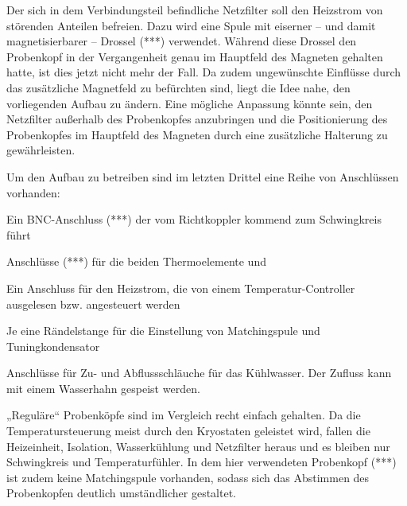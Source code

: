 
Der sich in dem Verbindungsteil befindliche Netzfilter soll den Heizstrom von störenden Anteilen befreien. Dazu wird eine Spule mit eiserner -- und damit magnetisierbarer -- Drossel (***) verwendet. Während diese Drossel den Probenkopf in der Vergangenheit genau im Hauptfeld des Magneten gehalten hatte, ist dies jetzt nicht mehr der Fall. Da zudem ungewünschte Einflüsse durch das zusätzliche Magnetfeld zu befürchten sind, liegt die Idee nahe, den vorliegenden Aufbau zu ändern. Eine mögliche Anpassung könnte sein, den Netzfilter außerhalb des Probenkopfes anzubringen und die Positionierung des Probenkopfes im Hauptfeld des Magneten durch eine zusätzliche Halterung zu gewährleisten.

Um den Aufbau zu betreiben sind im letzten Drittel eine Reihe von Anschlüssen vorhanden:
\item Ein BNC-Anschluss (***) der vom Richtkoppler kommend zum Schwingkreis führt
\item Anschlüsse (***) für die beiden Thermoelemente und
\item Ein Anschluss für den Heizstrom, die von einem Temperatur-Controller ausgelesen bzw. angesteuert werden
\item Je eine Rändelstange für die Einstellung von Matchingspule und Tuningkondensator
\item Anschlüsse für Zu- und Abflussschläuche für das Kühlwasser. Der Zufluss kann mit einem Wasserhahn gespeist werden.


„Reguläre“ Probenköpfe sind im Vergleich recht einfach gehalten. Da die Temperatursteuerung meist durch den Kryostaten geleistet wird, fallen die Heizeinheit, Isolation, Wasserkühlung und Netzfilter heraus und es bleiben nur Schwingkreis und Temperaturfühler. In dem hier verwendeten Probenkopf (***) ist zudem keine Matchingspule vorhanden, sodass sich das Abstimmen des Probenkopfen deutlich umständlicher gestaltet.
